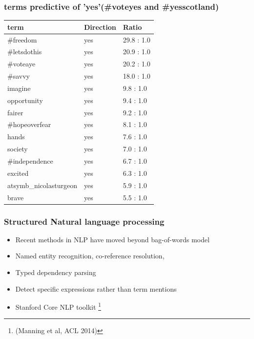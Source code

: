 \documentclass[11pt, table, dvipsnames]{beamer}
\begin{document}
\begin{frame}
\frametitle{terms predictive of 'yes'(\#voteyes and \#yesscotland)}
\begin{table}[!htbp]\centering
{}
\begin{tabular}{p{5cm}p{1.5cm}p{3cm}}
\hline
term & Direction & Ratio \\
\hline
\#freedom &                yes      &     29.8 : 1.0\\
\#letsdothis &                yes      &     20.9 : 1.0  \\            
\#voteaye &                yes      &     20.2 : 1.0\\
\#savvy &                yes      &     18.0 : 1.0\\
imagine &                yes     &      9.8 : 1.0\\
opportunity &                yes     &      9.4 : 1.0\\
fairer &                yes     &      9.2 : 1.0\\
\#hopeoverfear &                yes      &      8.1 : 1.0\\
hands &                yes     &      7.6 : 1.0\\
society &                yes     &      7.0 : 1.0\\
\#independence &                yes     &      6.7 : 1.0\\
excited &                yes     &      6.3 : 1.0\\
atsymb\_nicolasturgeon &                yes     &      5.9 : 1.0\\
brave &                yes     &      5.5 : 1.0\\
\hline
\end{tabular}
\end{table}
\end{frame}


\begin{frame}
  \frametitle{Structured Natural language processing}
  \begin{itemize}
  \item Recent methods in NLP have moved beyond bag-of-words model
  \item Named entity recognition, co-reference resolution, 
  \item Typed dependency parsing
  \item Detect specific expressions rather than term mentions
  \item Stanford Core NLP toolkit \footnote{(Manning et al, ACL 2014)}
  \end{itemize}
\end{frame}
\end{document}
